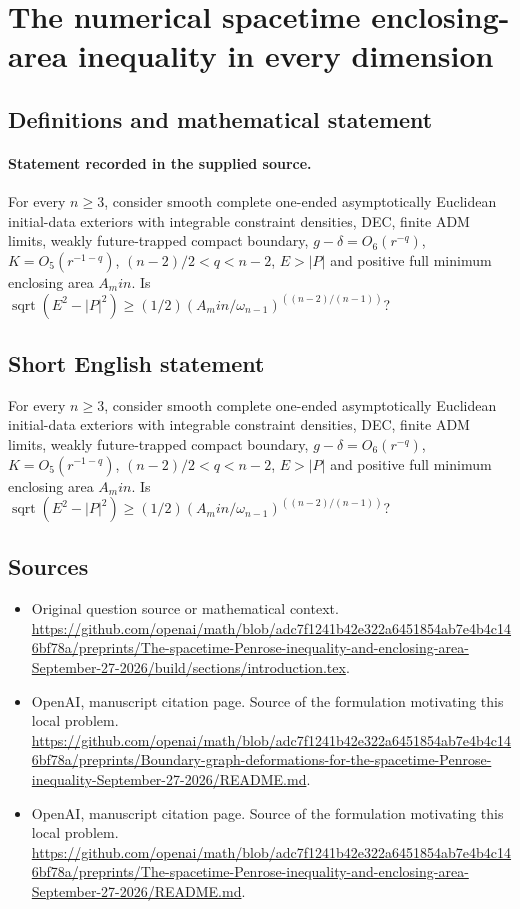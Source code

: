 \documentclass[11pt]{article}
\begin{document}
\section*{The numerical spacetime enclosing-area inequality in every dimension}\label{30007207}
\subsection{Definitions and mathematical statement}
\paragraph{Statement recorded in the supplied source.}
For every $n\geq 3$, consider smooth complete one-ended asymptotically Euclidean initial-data exteriors with integrable constraint densities, DEC, finite ADM limits, weakly future-trapped compact boundary, $g-\delta =O_6(r^{-q})$, $K=O_5(r^{-1-q})$, $(n-2)/2<q<n-2$, $E>|P|$ and positive full minimum enclosing area $A_min$. Is $\operatorname{sqrt}(E^2-|P|^2)\geq (1/2)(A_min/\omega _{n-1})^((n-2)/(n-1))$?
\subsection{Short English statement}
For every $n\geq 3$, consider smooth complete one-ended asymptotically Euclidean initial-data exteriors with integrable constraint densities, DEC, finite ADM limits, weakly future-trapped compact boundary, $g-\delta =O_6(r^{-q})$, $K=O_5(r^{-1-q})$, $(n-2)/2<q<n-2$, $E>|P|$ and positive full minimum enclosing area $A_min$. Is $\operatorname{sqrt}(E^2-|P|^2)\geq (1/2)(A_min/\omega _{n-1})^((n-2)/(n-1))$?
\subsection{Sources}
\begin{itemize}
\item[S1] Original question source or mathematical context.
\url{https://github.com/openai/math/blob/adc7f1241b42e322a6451854ab7e4b4c146bf78a/preprints/The-spacetime-Penrose-inequality-and-enclosing-area-September-27-2026/build/sections/introduction.tex}.
\item[S2] OpenAI, manuscript citation page. Source of the formulation motivating this local problem.
\url{https://github.com/openai/math/blob/adc7f1241b42e322a6451854ab7e4b4c146bf78a/preprints/Boundary-graph-deformations-for-the-spacetime-Penrose-inequality-September-27-2026/README.md}.
\item[S3] OpenAI, manuscript citation page. Source of the formulation motivating this local problem.
\url{https://github.com/openai/math/blob/adc7f1241b42e322a6451854ab7e4b4c146bf78a/preprints/The-spacetime-Penrose-inequality-and-enclosing-area-September-27-2026/README.md}.
\end{itemize}
\end{document}
